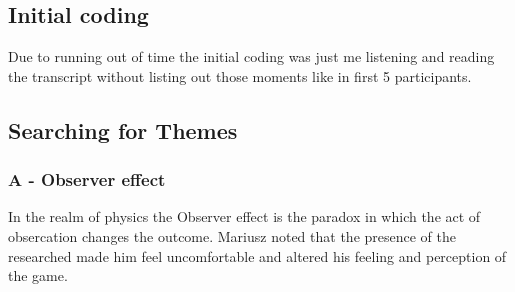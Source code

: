  
    

\subsection{Initial coding}

Due to running out of time the initial coding was just me listening and reading the transcript without listing out those moments like in first 5 participants. 
         


\subsection{Searching for Themes}

\subsubsection{A - Observer effect}

In the realm of physics the Observer effect is the paradox in which the act of obsercation changes the outcome. Mariusz noted that the presence of the researched made him feel uncomfortable and altered his feeling and perception of the game. 

